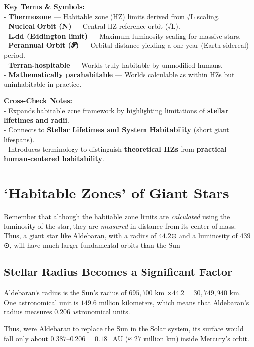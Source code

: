 \documentclass[
  letterpaper,
]{book}
\begin{document}
\textbf{Key Terms \& Symbols:}\\
- \textbf{Thermozone} --- Habitable zone (HZ) limits derived from √L
scaling.\\
- \textbf{Nucleal Orbit (N)} --- Central HZ reference orbit (√L).\\
- \textbf{Lₑdd (Eddington limit)} --- Maximum luminosity scaling for
massive stars.\\
- \textbf{Perannual Orbit (𝓟)} --- Orbital distance yielding a one-year
(Earth sidereal) period.\\
- \textbf{Terran-hospitable} --- Worlds truly habitable by unmodified
humans.\\
- \textbf{Mathematically parahabitable} --- Worlds calculable as within
HZs but uninhabitable in practice.

\textbf{Cross-Check Notes:}\\
- Expands habitable zone framework by highlighting limitations of
\textbf{stellar lifetimes and radii}.\\
- Connects to \textbf{Stellar Lifetimes and System Habitability} (short
giant lifespans).\\
- Introduces terminology to distinguish \textbf{theoretical HZs} from
\textbf{practical human-centered habitability}.

\chapter{`Habitable Zones' of Giant
Stars}\label{habitable-zones-of-giant-stars}

Remember that although the habitable zone limits are \emph{calculated}
using the luminosity of the star, they are \emph{measured} in distance
from its center of mass. Thus, a giant star like Aldebaran, with a
radius of \(44.2\)⊙ and a luminosity of \(439\)⊙, will have much larger
fundamental orbits than the Sun.

\section{Stellar Radius Becomes a Significant
Factor}\label{stellar-radius-becomes-a-significant-factor}

Aldebaran's radius is the Sun's radius of \(695,700\) km
\(\times 44.2 = 30,749,940\) km. One astronomical unit is \(149.6\)
million kilometers, which means that Aldebaran's radius measures
\(0.206\) astronomical units.

Thus, were Aldebaran to replace the Sun in the Solar system, its surface
would fall only about \(0.387 – 0.206 = 0.181\) AU (≈ \(27\) million km)
inside Mercury's orbit.
\end{document}
